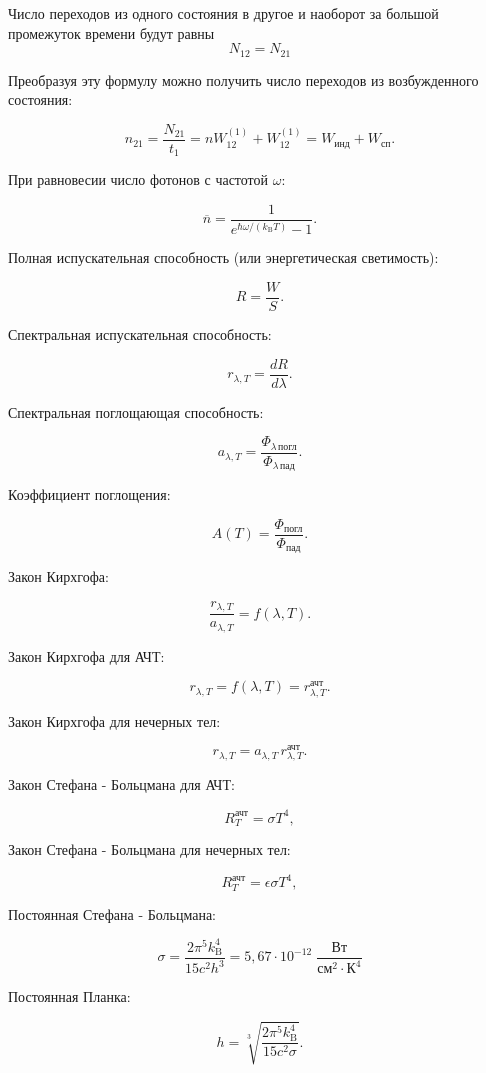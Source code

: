 \documentclass[a4paper]{article}
\begin{document}
Число переходов из одного состояния в другое и наоборот за большой промежуток времени будут равны
\[N_{12} = N_{21}\]

Преобразуя эту формулу можно получить число переходов из возбужденного состояния:

\[
n_{21} = \frac{N_{21}}{t_1} = n W_{12}^{(1)} + W_{12}^{(1)} = W_{\text{инд}} + W_{\text{сп}}. \tag{4}
\]

При равновесии число фотонов с частотой $\omega$:

\[
\overline{n} = \frac{1}{e^{\hbar\omega/(k_{\mathrm{B}}T)} - 1}.\tag{5}
\]

Полная испускательная способность (или энергетическая светимость):

\[
R = \frac{W}{S}.\tag{6}
\]

Спектральная испускательная способность:

\[
r_{\lambda, T} = \frac{dR}{d\lambda}.\tag{7}
\]

Спектральная поглощающая способность:

\[
a_{\lambda, T} = \frac{\Phi_{\lambda\,\text{погл}}}{\Phi_{\lambda\,\text{пад}}}.\tag{8}
\]

Коэффициент поглощения: 

\[
A(T) = \frac{\Phi_{\text{погл}}}{\Phi_{\text{пад}}}.\tag{9}
\]

Закон Кирхгофа: 

\[
\frac{r_{\lambda, T}}{a_{\lambda, T}} = f(\lambda, T).\tag{10}
\]

Закон Кирхгофа для АЧТ:

\[
r_{\lambda, T} = f(\lambda, T) = r_{\lambda, T}^{\text{ачт}}.\tag{11}
\]

Закон Кирхгофа для нечерных тел:

\[
r_{\lambda, T} = a_{\lambda, T} \, r_{\lambda, T}^{\text{ачт}}.\tag{12}
\]

Закон Стефана - Больцмана для АЧТ:

\[
R_T^{\text{ачт}} = \sigma T^4, \tag{13}
\]

Закон Стефана - Больцмана для нечерных тел:

\[
R_T^{\text{ачт}} =\epsilon \sigma T^4, \tag{14}
\]

Постоянная Стефана - Больцмана:

\[
\sigma = \frac{2\pi^5 k_{\mathrm{B}}^4}{15 c^2 h^3} = 5{,}67 \cdot 10^{-12} \; \frac{\text{Вт}}{\text{см}^2 \cdot \text{К}^4}\tag{15}
\]

Постоянная Планка:

\[
h = \sqrt[3]{\frac{2\pi^5 k_{\mathrm{B}}^4}{15 c^2 \sigma}}.\tag{16}
\]
\end{document}

